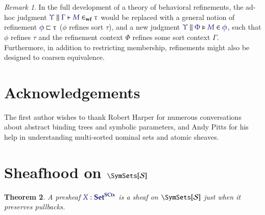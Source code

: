 \documentclass[11pt]{article}
\newtheorem{thm}{Theorem}[section]
\theoremstyle{definition}
\theoremstyle{remark}
\newtheorem{remark}[thm]{Remark}
\numberwithin{equation}{section}
\newcommand\IsWf[4]{%
  \IMode{#1}\parallel%
  \IMode{#2}\vdash%
  \IMode{#3}\in_{\mathbf{wf}}\IMode{#4}%
}
\newcommand\SCtxSite{\SymSets[\Sorts]}
\begin{document}
\begin{remark}
  In the full development of a theory of behavioral refinements, the ad-hoc
  judgment $\IsWf{\Upsilon}{\Gamma}{M}{\tau}$ would be replaced with a general
  notion of refinement $\IMode{\phi}\sqsubset\tau$ ($\phi$ refines sort
  $\tau$), and a new judgment $\IMode{\Upsilon}\parallel\IMode{\Phi}\vDash
  \IMode{M} \in \IMode{\phi}$, such that $\phi$ refines $\tau$ and the
  refinement context $\Phi$ refines some sort context $\Gamma$. Furthermore, in
  addition to restricting membership, refinements might also be designed to
  coarsen equivalence.
\end{remark}

\section*{Acknowledgements}

The first author wishes to thank Robert Harper for numerous conversations about
abstract binding trees and symbolic parameters, and Andy Pitts for his help in
understanding multi-sorted nominal sets and atomic sheaves.

\newpage
\appendix
\appendixpage

\section{Sheafhood on $\SCtxSite$}

\begin{thm}
  \label{thm:pullback-preservation}
  A presheaf $\Of{X}{\Sets^{\SCtx}}$ is a sheaf on $\SCtxSite$ just when it
  preserves pullbacks.
\end{thm}
\end{document}
